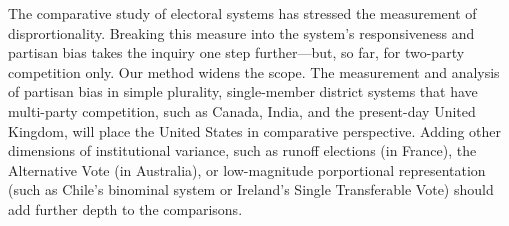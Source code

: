 

The comparative study of electoral systems has stressed the measurement of disprortionality. Breaking this measure into the system's responsiveness and partisan bias takes the inquiry one step further---but, so far, for two-party competition only. Our method widens the scope. The measurement and analysis of partisan bias in simple plurality, single-member district systems that have multi-party competition, such as Canada, India, and the present-day United Kingdom, will place the United States in comparative perspective. Adding other dimensions of institutional variance, such as runoff elections (in France), the Alternative Vote (in Australia), or low-magnitude porportional representation (such as Chile's binominal system or Ireland's Single Transferable Vote) should add further depth to the comparisons. 


